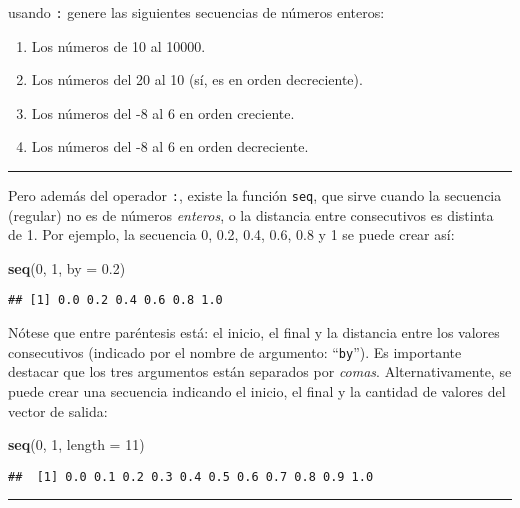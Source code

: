 \documentclass[]{article}
\newenvironment{Shaded}{}{}
\newcommand{\KeywordTok}[1]{\textcolor[rgb]{0.00,0.44,0.13}{\textbf{{#1}}}}
\newcommand{\DataTypeTok}[1]{\textcolor[rgb]{0.56,0.13,0.00}{{#1}}}
\newcommand{\DecValTok}[1]{\textcolor[rgb]{0.25,0.63,0.44}{{#1}}}
\newcommand{\FloatTok}[1]{\textcolor[rgb]{0.25,0.63,0.44}{{#1}}}
\newcommand{\NormalTok}[1]{{#1}}
\begin{document}
usando \texttt{:} genere las siguientes secuencias de números enteros:

\begin{enumerate}[1.]
\item
  Los números de 10 al 10000.
\item
  Los números del 20 al 10 (sí, es en orden decreciente).
\item
  Los números del -8 al 6 en orden creciente.
\item
  Los números del -8 al 6 en orden decreciente.
\end{enumerate}
\begin{center}\rule{3in}{0.4pt}\end{center}

Pero además del operador \texttt{:}, existe la función \texttt{seq}, que
sirve cuando la secuencia (regular) no es de números \emph{enteros}, o
la distancia entre consecutivos es distinta de 1. Por ejemplo, la
secuencia 0, 0.2, 0.4, 0.6, 0.8 y 1 se puede crear así:

\begin{Shaded}
\begin{Highlighting}[]
\KeywordTok{seq}\NormalTok{(}\DecValTok{0}\NormalTok{, }\DecValTok{1}\NormalTok{, }\DataTypeTok{by =} \FloatTok{0.2}\NormalTok{)}
\end{Highlighting}
\end{Shaded}
\begin{verbatim}
## [1] 0.0 0.2 0.4 0.6 0.8 1.0
\end{verbatim}
Nótese que entre paréntesis está: el inicio, el final y la distancia
entre los valores consecutivos (indicado por el nombre de argumento:
``\texttt{by}''). Es importante destacar que los tres argumentos están
separados por \emph{comas}. Alternativamente, se puede crear una
secuencia indicando el inicio, el final y la cantidad de valores del
vector de salida:

\begin{Shaded}
\begin{Highlighting}[]
\KeywordTok{seq}\NormalTok{(}\DecValTok{0}\NormalTok{, }\DecValTok{1}\NormalTok{, }\DataTypeTok{length =} \DecValTok{11}\NormalTok{)}
\end{Highlighting}
\end{Shaded}
\begin{verbatim}
##  [1] 0.0 0.1 0.2 0.3 0.4 0.5 0.6 0.7 0.8 0.9 1.0
\end{verbatim}
\begin{center}\rule{3in}{0.4pt}\end{center}
\end{document}
